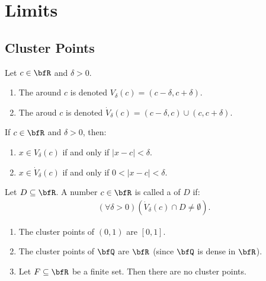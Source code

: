 \chapter{Limits}
\vspace{12pt}

\section{Cluster Points}
    \begin{definition}
        Let $c \in \bfR$ and $\delta > 0$.
        \begin{enumerate}[label = (\arabic*)]
            \item The  around $c$ is denoted $V_\delta(c) = (c-\delta,c+\delta)$.
            \item The  aroud $c$ is denoted $\dot{V}_\delta(c) = (c -\delta ,c) \cup (c,c + \delta)$.
        \end{enumerate}
    \end{definition}

    \begin{lemma}
        If $c \in \bfR$ and $\delta > 0$, then:
            \begin{enumerate}[label = (\arabic*)]
                \item $x \in V_\delta(c)$ if and only if $|x-c| < \delta$.
                \item $x \in \dot{V}_\delta(c)$ if and only if $0 < |x-c| < \delta$.
            \end{enumerate}
    \end{lemma}

    \begin{definition}
        Let $D \subseteq \bfR$. A number $c \in \bfR$ is called a  of $D$ if:
            \begin{equation*}
            \begin{split}
                (\forall \delta > 0)(\dot{V}_\delta(c) \cap D \neq \emptyset).
            \end{split}
            \end{equation*}
    \end{definition}

    \begin{example}
        \phantom{a}
        \begin{enumerate}[label = (\arabic*)]
            \item The cluster points of $(0,1)$ are $[0,1]$.
            \item The cluster points of $\bfQ$ are $\bfR$ {\tiny (since $\bfQ$ is dense in $\bfR$)}.
            \item Let $F \subseteq \bfR$ be a finite set. Then there are no cluster points.
        \end{enumerate}
    \end{example}


